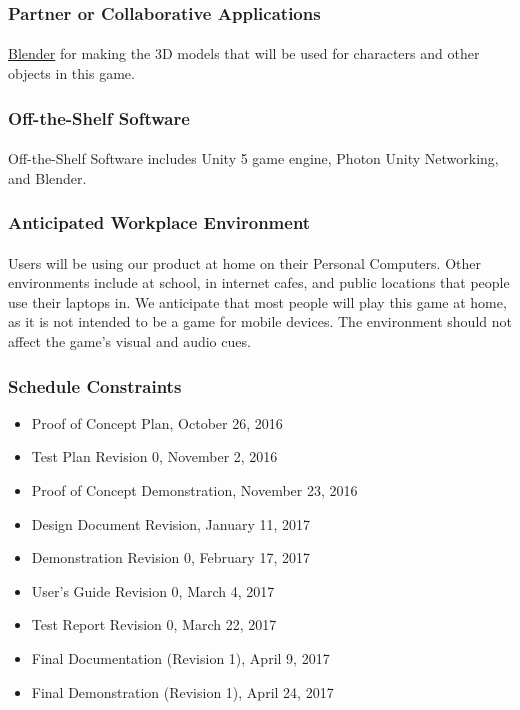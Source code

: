 \documentclass[12pt, titlepage]{article}
\begin{document}
\subsubsection{Partner or Collaborative Applications}
\paragraph{}\href{https://www.blender.org/}{Blender} for making the 3D models that will be used for characters and other objects in this game.
\subsubsection{Off-the-Shelf Software}
\paragraph{}Off-the-Shelf Software includes Unity 5 game engine, Photon Unity Networking, and Blender.
\subsubsection{Anticipated Workplace Environment}
\paragraph{}Users will be using our product at home on their Personal Computers. Other environments include at school, in internet cafes, and public locations that people use their laptops in. We anticipate that most people will play this game at home, as it is not intended to be a game for mobile devices. The environment should not affect the game's visual and audio cues. 
\subsubsection{Schedule Constraints}
\begin{itemize}
    \item Proof of Concept Plan, October 26, 2016
    \item Test Plan Revision 0, November 2, 2016
    \item Proof of Concept Demonstration, November 23, 2016
    \item Design Document Revision, January 11, 2017
    \item Demonstration Revision 0,  February 17, 2017
    \item User’s Guide Revision 0, March 4, 2017
    \item Test Report Revision 0, March 22, 2017
    \item Final Documentation (Revision 1), April 9, 2017
    \item Final Demonstration (Revision 1), April 24, 2017
\end{itemize}
\end{document}
